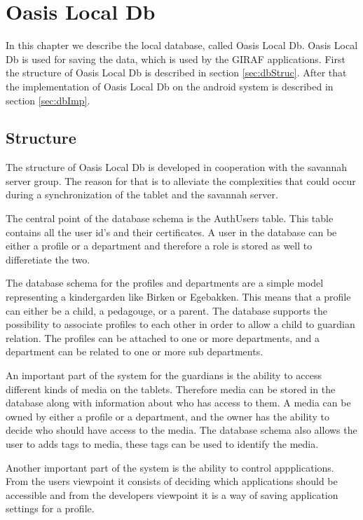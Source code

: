 \chapter{Oasis Local Db}
\label{ch:Db}
In this chapter we describe the local database, called Oasis Local Db. Oasis Local Db is used for saving the data, which is used by the GIRAF applications. First the structure of Oasis Local Db is described in section \vref{sec:dbStruc}. After that the implementation of Oasis Local Db on the android system is described in section \vref{sec:dbImp}.

\section{Structure}
\label{sec:dbStruc}
The structure of Oasis Local Db is developed in cooperation with the savannah server group. The reason for that is to alleviate the complexities that could occur during a synchronization of the tablet and the savannah server. 

The central point of the database schema is the AuthUsers table.
This table contains all the user id's and their certificates.
A user in the database can be either a profile or a department and therefore a role is stored as well to differetiate the two.

The database schema for the profiles and departments are a simple model representing a kindergarden like Birken or Egebakken.
This means that a profile can either be a child, a pedagouge, or a parent.
The database supports the possibility to associate profiles to each other in order to allow a child to guardian relation.
The profiles can be attached to one or more departments, and a department can be related to one or more sub departments.

An important part of the system for the guardians is the ability to access different kinds of media on the tablets.
Therefore media can be stored in the database along with information about who has access to them.
A media can be owned by either a profile or a department, and the owner has the ability to decide who should have access to the media.
The database schema also allows the user to adds tags to media, these tags can be used to identify the media.

Another important part of the system is the ability to control appplications.
From the users viewpoint it consists of deciding which applications should be accessible and from the developers viewpoint it is a way of saving application settings for a profile.

